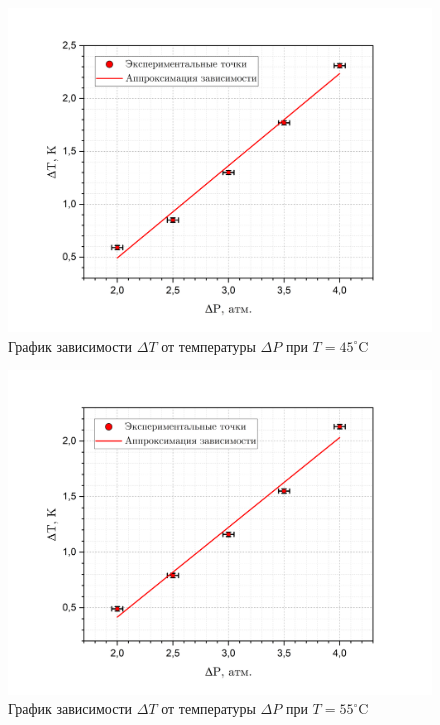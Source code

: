 \documentclass[a4paper, 12pt]{article}
\begin{document}
    \begin{figure}[H]
        \centering
        \includegraphics[width=14cm]{images/graph_45.png}
        \caption{График зависимости $\Delta T$ от температуры $\Delta P$ при $T = 45 ^\circ$C}
        \label{graph_45}
    \end{figure}

    \begin{figure}[H]
        \centering
        \includegraphics[width=14cm]{images/graph_55.png}
        \caption{График зависимости $\Delta T$ от температуры $\Delta P$ при $T = 55 ^\circ$C}
        \label{graph_55}
    \end{figure}
\end{document}
